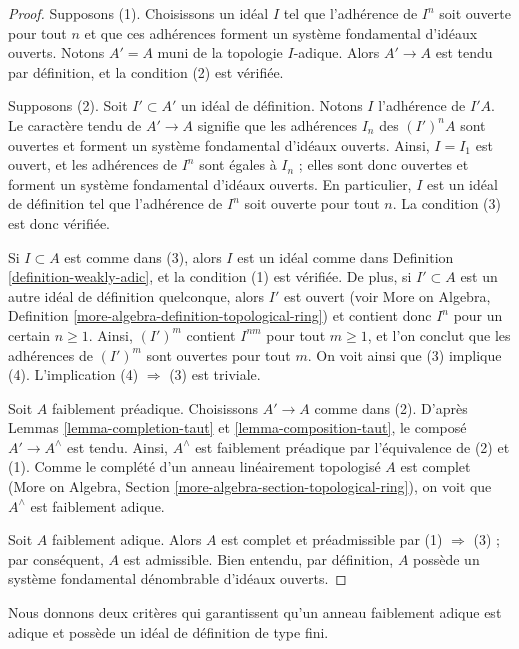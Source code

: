 \begin{proof}
Supposons (1). Choisissons un idéal $I$ tel que l'adhérence
de $I^n$ soit ouverte pour tout $n$ et que ces adhérences forment
un système fondamental d'idéaux ouverts. Notons $A' = A$ muni de
la topologie $I$-adique. Alors $A' \to A$ est tendu par définition,
et la condition (2) est vérifiée.

\medskip\noindent
Supposons (2). Soit $I' \subset A'$ un idéal de définition.
Notons $I$ l'adhérence de $I'A$. Le caractère tendu de $A' \to A$ signifie
que les adhérences $I_n$ des $(I')^nA$ sont ouvertes et forment un système fondamental
d'idéaux ouverts. Ainsi, $I = I_1$ est ouvert, et les adhérences de $I^n$
sont égales à $I_n$ ; elles sont donc ouvertes et forment un système fondamental
d'idéaux ouverts. En particulier, $I$ est un idéal de définition
tel que l'adhérence de $I^n$ soit ouverte pour tout $n$. La condition (3) est donc vérifiée.

\medskip\noindent
Si $I \subset A$ est comme dans (3), alors $I$ est un idéal comme dans
Definition \ref{definition-weakly-adic}, et la condition (1) est vérifiée.
De plus, si $I' \subset A$ est un autre idéal de définition quelconque, alors
$I'$ est ouvert (voir More on Algebra, Definition
\ref{more-algebra-definition-topological-ring})
et contient donc $I^n$ pour un certain $n \geq 1$.
Ainsi, $(I')^m$ contient $I^{nm}$ pour tout $m \geq 1$, et l'on
conclut que les adhérences de $(I')^m$ sont ouvertes pour tout $m$.
On voit ainsi que (3) implique (4).
L'implication (4) $\Rightarrow$ (3) est triviale.

\medskip\noindent
Soit $A$ faiblement préadique. Choisissons $A' \to A$ comme dans (2).
D'après Lemmas \ref{lemma-completion-taut} et
\ref{lemma-composition-taut},
le composé $A' \to A^\wedge$ est tendu. Ainsi, $A^\wedge$
est faiblement préadique par l'équivalence de (2) et (1).
Comme le complété d'un anneau linéairement topologisé $A$ est complet
(More on Algebra, Section \ref{more-algebra-section-topological-ring}),
on voit que $A^\wedge$ est faiblement adique.

\medskip\noindent
Soit $A$ faiblement adique. Alors $A$ est complet
et préadmissible par (1) $\Rightarrow$ (3) ; par conséquent, $A$
est admissible. Bien entendu, par définition, $A$ possède un système fondamental
dénombrable d'idéaux ouverts.
\end{proof}

\noindent
Nous donnons deux critères qui garantissent qu'un anneau faiblement adique
est adique et possède un idéal de définition de type fini.

